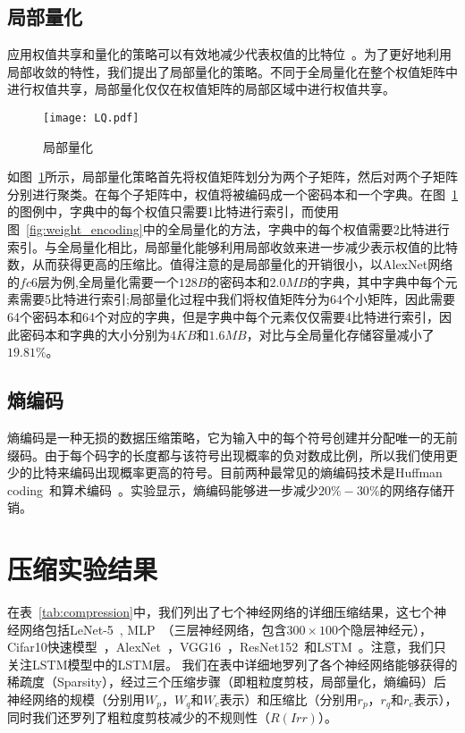 \subsection{局部量化}

应用权值共享和量化的策略可以有效地减少代表权值的比特位~\cite{han2015deep}。为了更好地利用局部收敛的特性，我们提出了局部量化的策略。不同于全局量化在整个权值矩阵中进行权值共享，局部量化仅仅在权值矩阵的局部区域中进行权值共享。

\begin{figure}[h]
  \centering
  \texttt{[image: LQ.pdf]}
  \caption{局部量化}
  \label{fig:local_quantization}
\end{figure}

如图~\ref{fig:local_quantization}所示，局部量化策略首先将权值矩阵划分为两个子矩阵，然后对两个子矩阵分别进行聚类。在每个子矩阵中，权值将被编码成一个密码本和一个字典。在图~\ref{fig:local_quantization}的图例中，字典中的每个权值只需要1比特进行索引，而使用图~\ref{fig:weight_encoding}中的全局量化的方法，字典中的每个权值需要2比特进行索引。与全局量化相比，局部量化能够利用局部收敛来进一步减少表示权值的比特数，从而获得更高的压缩比。值得注意的是局部量化的开销很小，以AlexNet网络的$fc6$层为例,全局量化需要一个$128B$的密码本和$2.0MB$的字典，其中字典中每个元素需要5比特进行索引;局部量化过程中我们将权值矩阵分为64个小矩阵，因此需要64个密码本和64个对应的字典，但是字典中每个元素仅仅需要4比特进行索引，因此密码本和字典的大小分别为$4KB$和$1.6MB$，对比与全局量化存储容量减小了$19.81\%$。


\subsection{熵编码}
熵编码是一种无损的数据压缩策略，它为输入中的每个符号创建并分配唯一的无前缀码。由于每个码字的长度都与该符号出现概率的负对数成比例，所以我们使用更少的比特来编码出现概率更高的符号。目前两种最常见的熵编码技术是Huffman coding~\cite{huffman1952method}和算术编码~\cite{witten1987arithmetic}。实验显示，熵编码能够进一步减少$20\% - 30\%$的网络存储开销。

\section{压缩实验结果}

在表~\ref{tab:compression}中，我们列出了七个神经网络的详细压缩结果，这七个神经网络包括LeNet-5~\cite{lecun1998gradient}, MLP~\cite{Srivastava2014}（三层神经网络，包含$300\times 100$个隐层神经元），Cifar10快速模型~\cite{krizhevsky2012cuda}，AlexNet~\cite{krizhevsky2012imagenet}，VGG16~\cite{simonyan2014very}，ResNet152~\cite{he2016deep}和LSTM~\cite{sak2014long}。注意，我们只关注LSTM模型中的LSTM层。
我们在表中详细地罗列了各个神经网络能够获得的稀疏度（Sparsity），经过三个压缩步骤（即粗粒度剪枝，局部量化，熵编码）后神经网络的规模（分别用$W_p$，$W_q$和$W_c$表示）和压缩比（分别用$r_p$，$r_q$和$r_c$表示），同时我们还罗列了粗粒度剪枝减少的不规则性（$R(Irr)$）。

